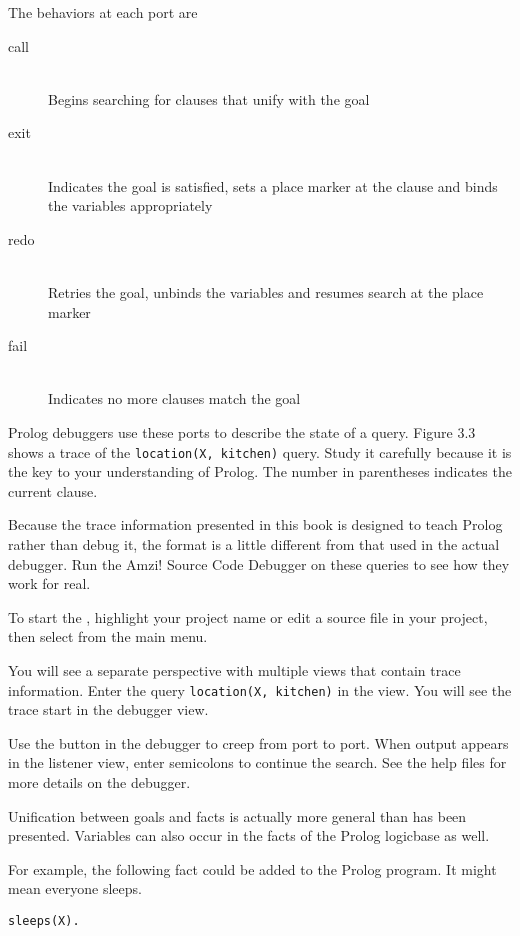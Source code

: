 \noindent
The behaviors at each port are
\begin{description}
\item[call]\ \\Begins searching for clauses that unify with the goal
\item[exit]\ \\Indicates the goal is satisfied, sets a place marker at the
clause and binds the variables appropriately
\item[redo]\ \\Retries the goal, unbinds the variables and resumes search at the
place marker
\item[fail]\ \\Indicates no more clauses match the goal
\end{description}

Prolog debuggers use these ports to describe the state of a query. Figure 3.3
shows a trace of the \verb'location(X, kitchen)' query. Study it carefully
because it is the key to your understanding of Prolog. The number in parentheses
indicates the current clause.


Because the trace information presented in this book is designed to teach Prolog
rather than debug it, the format is a little different from that used in the
actual debugger. Run the Amzi! Source Code Debugger on these queries to see how
they work for real.

To start the , highlight your project name or edit a source
file in your project, then select 
from the main menu.

You will see a separate perspective with multiple views that contain trace
information. Enter the query \verb'location(X, kitchen)' in the  view. You will see the trace start in the debugger view.

Use the  button in the debugger to creep from port to port. When
output appears in the listener view, enter semicolons \keys{;} to continue the
search. See the help files for more details on the debugger.

Unification between goals and facts is actually more general than has been
presented. Variables can also occur in the facts of the Prolog logicbase as
well.

For example, the following fact could be added to the Prolog program. It might
mean everyone sleeps.
\begin{verbatim}
sleeps(X).
\end{verbatim}


